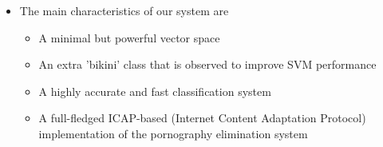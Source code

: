 \documentclass[portrait,a0paper,final,margin=6em]{baposter}
\begin{document}
\begin{poster}
{\begin{itemize}
		\item The main characteristics of our system are
		
		\begin{itemize}
			\item A minimal but powerful vector space
			\item An extra 'bikini' class that is observed to improve SVM performance
			\item A highly accurate and fast classification system
			\item A full-fledged ICAP-based (Internet Content Adaptation Protocol) implementation of the pornography elimination system
		\end{itemize}
	\end{itemize}
	\vspace{1 cm}
  }

\end{poster}
\end{document}
